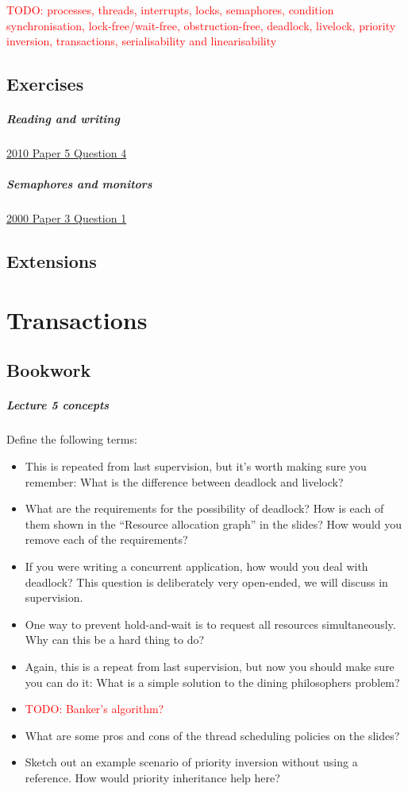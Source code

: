 \documentclass[12pt,a4paper,oneside,openright]{report}
\newcommand{\question}[2]{\paragraph{#1} #2}
\newcommand{\todo}[1]{\textcolor{red}{TODO: #1}}
\begin{document}
\todo{processes, threads, interrupts, locks, semaphores, condition
  synchronisation, lock-free/wait-free, obstruction-free, deadlock,
  livelock, priority inversion, transactions, serialisability and
  linearisability}

\section{Exercises}

\question{Reading and
  writing}{\href{https://www.cl.cam.ac.uk/teaching/exams/pastpapers/y2010p5q4.pdf}{2010
    Paper 5 Question 4}}

\question{Semaphores and
  monitors}{\href{https://www.cl.cam.ac.uk/teaching/exams/pastpapers/y2000p3q1.pdf}{2000
    Paper 3 Question 1}}

\section{Extensions}


\chapter{Transactions}

\section{Bookwork}

\question{Lecture 5 concepts}{Define the following terms:
  \begin{itemize}
  \item This is repeated from last supervision, but it's worth making
    sure you remember: What is the difference between deadlock and
    livelock?
  \item What are the requirements for the possibility of deadlock? How
    is each of them shown in the ``Resource allocation graph'' in the
    slides? How would you remove each of the requirements?
  \item If you were writing a concurrent application, how would you
    deal with deadlock? This question is deliberately very open-ended,
    we will discuss in supervision.
  \item One way to prevent hold-and-wait is to request all resources
    simultaneously. Why can this be a hard thing to do?
  \item Again, this is a repeat from last supervision, but now you
    should make sure you can do it: What is a simple solution to the
    dining philosophers problem?
  \item \todo{Banker's algorithm?}
  \item What are some pros and cons of the thread scheduling policies
    on the slides?
  \item Sketch out an example scenario of priority inversion without
    using a reference. How would priority inheritance help here?
  \end{itemize}
}
\end{document}
